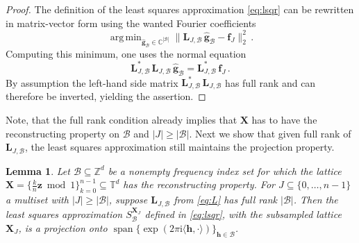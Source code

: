 \documentclass[a4paper]{amsart}
\newtheorem{lemma}[theorem]{Lemma}
\renewcommand{\hat}{\widehat}
\DeclareMathOperator{\Span}{span}
\DeclareMathOperator*{\Argmin}{arg\,min}
\newcommand{\modone}{\bmod{}1}
\begin{document}
\begin{proof} The definition of the least squares approximation \eqref{eq:lsqr} can be rewritten in matrix-vector form using the wanted Fourier coefficients
    \begin{equation*}
        \Argmin_{\bm{\hat g}_{\mathcal B} \in\mathds C^{|\mathcal B|}}
        \| \bm L_{J,\mathcal B} \, \bm{\hat g}_{\mathcal B} - \bm f_J \|_{2}^{2} \,.
    \end{equation*}
    Computing this minimum, one uses the normal equation
    \begin{equation*}
        \bm L_{J,\mathcal B}^\ast \, \bm L_{J,\mathcal B} \, \bm{\hat g}_{\mathcal B} 
        = \bm L_{J,\mathcal B}^\ast \, \bm f_J \,.
    \end{equation*}
    By assumption the left-hand side matrix $\bm L_{J,\mathcal B}^\ast \, \bm L_{J,\mathcal B}$ has full rank and can therefore be inverted, yielding the assertion.
\end{proof} 

Note, that the full rank condition already implies that $\bm X$ has to have the reconstructing property on $\mathcal B$ and $|J|\ge|\mathcal B|$.
Next we show that given full rank of $\bm L_{J,\mathcal B}$, the least squares approximation still maintains the projection property.

\begin{lemma}\label{lsqrprojection} Let $\mathcal B\subseteq\mathds Z^d$ be a nonempty frequency index set for which the lattice $\bm X = \{\frac kn\bm z\modone\}_{k=0}^{n-1} \subseteq\mathds T^d$ has the reconstructing property.
    For $J\subseteq\{0,\dots,n-1\}$ a multiset with $|J|\ge|\mathcal B|$, suppose $\bm L_{J,\mathcal B}$ from \eqref{eq:L} has full rank $|\mathcal B|$.
    Then the least squares approximation $S_{\mathcal B}^{\bm X_J}$ defined in \eqref{eq:lsqr}, with the subsampled lattice $\bm X_J$, is a projection onto $\Span\{\exp(2\pi\mathrm i\langle\bm h,\cdot\rangle)\}_{\bm h\in\mathcal B}$.

\end{lemma} 
\end{document}

